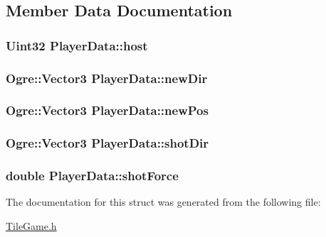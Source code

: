 \subsection{Member Data Documentation}
\hypertarget{structPlayerData_afedaac99a073198e7347fb41df68bbdf}{
\subsubsection[{host}]{\setlength{\rightskip}{0pt plus 5cm}Uint32 Player\-Data\-::host}}\label{structPlayerData_afedaac99a073198e7347fb41df68bbdf}
\hypertarget{structPlayerData_a24adab3caa5143343ef885fc71c449de}{
\subsubsection[{new\-Dir}]{\setlength{\rightskip}{0pt plus 5cm}Ogre\-::\-Vector3 Player\-Data\-::new\-Dir}}\label{structPlayerData_a24adab3caa5143343ef885fc71c449de}
\hypertarget{structPlayerData_ab63193631eb26d16924e7b81aab109be}{
\subsubsection[{new\-Pos}]{\setlength{\rightskip}{0pt plus 5cm}Ogre\-::\-Vector3 Player\-Data\-::new\-Pos}}\label{structPlayerData_ab63193631eb26d16924e7b81aab109be}
\hypertarget{structPlayerData_acab3f24dcc83136321f31dd719fb855e}{
\subsubsection[{shot\-Dir}]{\setlength{\rightskip}{0pt plus 5cm}Ogre\-::\-Vector3 Player\-Data\-::shot\-Dir}}\label{structPlayerData_acab3f24dcc83136321f31dd719fb855e}
\hypertarget{structPlayerData_a793f89049e5fbf15cefe903487a56265}{
\subsubsection[{shot\-Force}]{\setlength{\rightskip}{0pt plus 5cm}double Player\-Data\-::shot\-Force}}\label{structPlayerData_a793f89049e5fbf15cefe903487a56265}


The documentation for this struct was generated from the following file\-:\begin{DoxyCompactItemize}
\item 
\hyperlink{TileGame_8h}{Tile\-Game.\-h}\end{DoxyCompactItemize}
